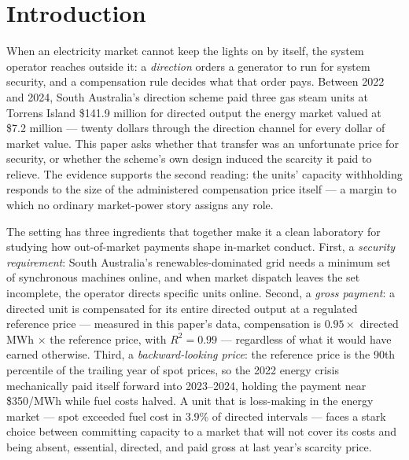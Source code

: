 \section{Introduction}\label{sec:intro}

When an electricity market cannot keep the lights on by itself, the system
operator reaches outside it: a \emph{direction} orders a generator to run for
system security, and a compensation rule decides what that order pays.
Between 2022 and 2024, South Australia's direction scheme paid three gas
steam units at Torrens Island \$141.9 million for directed output the energy
market valued at \$7.2 million --- twenty dollars through the direction
channel for every dollar of market value. This paper asks whether that
transfer was an unfortunate price for security, or whether the scheme's own
design induced the scarcity it paid to relieve. The evidence supports the
second reading: the units' capacity withholding responds to the size of the
administered compensation price itself --- a margin to which no ordinary
market-power story assigns any role.

The setting has three ingredients that together make it a clean laboratory
for studying how out-of-market payments shape in-market conduct. First, a
\emph{security requirement}: South Australia's renewables-dominated grid
needs a minimum set of synchronous machines online, and when market dispatch
leaves the set incomplete, the operator directs specific units online. Second, a
\emph{gross payment}: a directed unit is compensated for its entire directed
output at a regulated reference price --- measured in this paper's data,
compensation is $0.95 \times$ directed MWh $\times$ the reference price, with
$R^{2}=0.99$ --- regardless of what it would have earned otherwise. Third, a
\emph{backward-looking price}: the reference price is the 90th percentile of
the trailing year of spot prices, so the 2022 energy crisis mechanically
paid itself forward into 2023--2024, holding the payment near \$350/MWh while
fuel costs halved. A unit that is loss-making in the energy market --- spot
exceeded fuel cost in 3.9\% of directed intervals --- faces a stark
choice between committing capacity to a market that will not cover its costs
and being absent, essential, directed, and paid gross at last year's scarcity
price.

